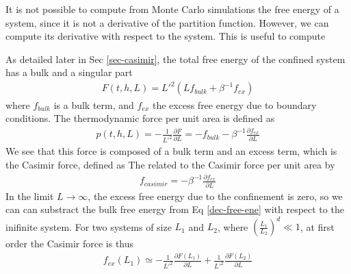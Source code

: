 It is not possible to compute from Monte Carlo simulations the free energy of a system, since it is not a derivative of the partition function. However, we can compute its derivative with respect to the system. This is useful to compute 
{\color{brown} As detailed later in Sec \ref{sec-casimir}, the total free energy of the confined system has a bulk and a singular part
\begin{align}
    F(t,h,L) = L'^2 \left( L f_{bulk} + \beta^{-1} f_{ex} \right)
    \label{dec-free-ene}
\end{align}
where $f_{bulk}$ is a bulk term, and $f_{ex}$ the excess free energy due to boundary conditions. 
The thermodynamic force per unit area is defined as 
\begin{align}
p(t,h,L) = - \frac{1}{L'^2 }\frac{\partial F}{\partial L} = - f_{bulk} - \beta^{-1} \frac{\partial f_{ex}}{\partial L}
\label{casmir-mc}
\end{align}
We see that this force is composed of a bulk term and an excess term, which is the Casimir force, defined as
The related to the Casimir force per unit area by
\begin{align}
   f_{casimir} = - \beta^{-1} \frac{\partial  f_{ex}}{\partial L}
\end{align}
In the limit $L\to \infty$, the excess free energy due to the confinement is zero, so we can can substract the bulk free energy from Eq \eqref{dec-free-ene} with respect to the inifinite system. For two systems of size $L_1$  and $L_2$, where $ \left( \frac{L_1}{L_2} \right)^d \ll 1$, at first order the Casimir force is thus
\begin{align}
    f_{ex}(L_1) \simeq - \frac{1}{L'^2} \frac{\partial F(L_1)}{\partial L} + \frac{1}{L'^2} \frac{\partial F(L_2)}{\partial L}
    \label{cas-diff}
\end{align}

}

